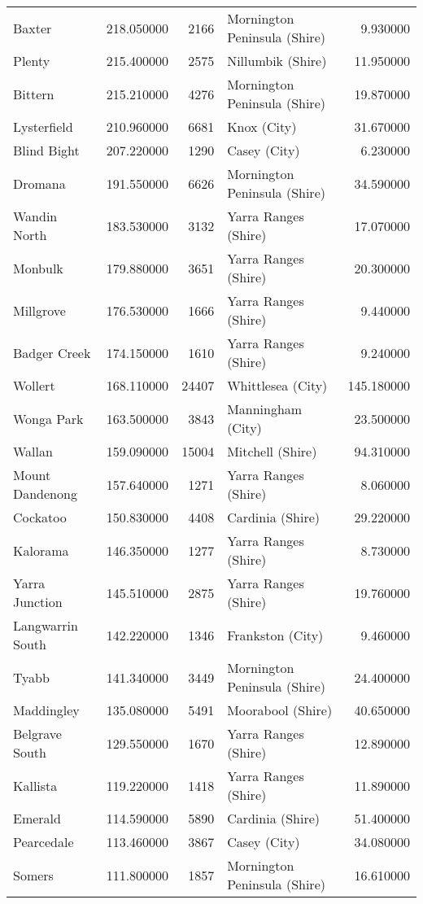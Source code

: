 \begin{longtable}{lrrlr}
Baxter & 218.050000 & 2166 & Mornington Peninsula (Shire) & 9.930000 \\
Plenty & 215.400000 & 2575 & Nillumbik (Shire) & 11.950000 \\
Bittern & 215.210000 & 4276 & Mornington Peninsula (Shire) & 19.870000 \\
Lysterfield & 210.960000 & 6681 & Knox (City) & 31.670000 \\
Blind Bight & 207.220000 & 1290 & Casey (City) & 6.230000 \\
Dromana & 191.550000 & 6626 & Mornington Peninsula (Shire) & 34.590000 \\
Wandin North & 183.530000 & 3132 & Yarra Ranges (Shire) & 17.070000 \\
Monbulk & 179.880000 & 3651 & Yarra Ranges (Shire) & 20.300000 \\
Millgrove & 176.530000 & 1666 & Yarra Ranges (Shire) & 9.440000 \\
Badger Creek & 174.150000 & 1610 & Yarra Ranges (Shire) & 9.240000 \\
Wollert & 168.110000 & 24407 & Whittlesea (City) & 145.180000 \\
Wonga Park & 163.500000 & 3843 & Manningham (City) & 23.500000 \\
Wallan & 159.090000 & 15004 & Mitchell (Shire) & 94.310000 \\
Mount Dandenong & 157.640000 & 1271 & Yarra Ranges (Shire) & 8.060000 \\
Cockatoo & 150.830000 & 4408 & Cardinia (Shire) & 29.220000 \\
Kalorama & 146.350000 & 1277 & Yarra Ranges (Shire) & 8.730000 \\
Yarra Junction & 145.510000 & 2875 & Yarra Ranges (Shire) & 19.760000 \\
Langwarrin South & 142.220000 & 1346 & Frankston (City) & 9.460000 \\
Tyabb & 141.340000 & 3449 & Mornington Peninsula (Shire) & 24.400000 \\
Maddingley & 135.080000 & 5491 & Moorabool (Shire) & 40.650000 \\
Belgrave South & 129.550000 & 1670 & Yarra Ranges (Shire) & 12.890000 \\
Kallista & 119.220000 & 1418 & Yarra Ranges (Shire) & 11.890000 \\
Emerald & 114.590000 & 5890 & Cardinia (Shire) & 51.400000 \\
Pearcedale & 113.460000 & 3867 & Casey (City) & 34.080000 \\
Somers & 111.800000 & 1857 & Mornington Peninsula (Shire) & 16.610000 \\

\end{longtable}

